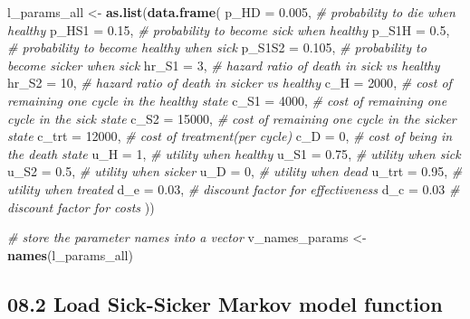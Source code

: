 \documentclass[
]{article}
\newenvironment{Shaded}{\begin{snugshade}}{\end{snugshade}}
\newcommand{\CommentTok}[1]{\textcolor[rgb]{0.56,0.35,0.01}{\textit{#1}}}
\newcommand{\DataTypeTok}[1]{\textcolor[rgb]{0.13,0.29,0.53}{#1}}
\newcommand{\DecValTok}[1]{\textcolor[rgb]{0.00,0.00,0.81}{#1}}
\newcommand{\FloatTok}[1]{\textcolor[rgb]{0.00,0.00,0.81}{#1}}
\newcommand{\KeywordTok}[1]{\textcolor[rgb]{0.13,0.29,0.53}{\textbf{#1}}}
\newcommand{\NormalTok}[1]{#1}
\newcommand{\StringTok}[1]{\textcolor[rgb]{0.31,0.60,0.02}{#1}}
\begin{document}
\begin{Shaded}
\begin{Highlighting}[]
\NormalTok{l_params_all <-}\StringTok{ }\KeywordTok{as.list}\NormalTok{(}\KeywordTok{data.frame}\NormalTok{(}
  \DataTypeTok{p_HD    =} \FloatTok{0.005}\NormalTok{,  }\CommentTok{# probability to die when healthy}
  \DataTypeTok{p_HS1   =} \FloatTok{0.15}\NormalTok{,   }\CommentTok{# probability to become sick when healthy}
  \DataTypeTok{p_S1H   =} \FloatTok{0.5}\NormalTok{,    }\CommentTok{# probability to become healthy when sick}
  \DataTypeTok{p_S1S2  =} \FloatTok{0.105}\NormalTok{,  }\CommentTok{# probability to become sicker when sick}
  \DataTypeTok{hr_S1   =} \DecValTok{3}\NormalTok{,      }\CommentTok{# hazard ratio of death in sick vs healthy}
  \DataTypeTok{hr_S2   =} \DecValTok{10}\NormalTok{,     }\CommentTok{# hazard ratio of death in sicker vs healthy}
  \DataTypeTok{c_H     =} \DecValTok{2000}\NormalTok{,   }\CommentTok{# cost of remaining one cycle in the healthy state}
  \DataTypeTok{c_S1    =} \DecValTok{4000}\NormalTok{,   }\CommentTok{# cost of remaining one cycle in the sick state}
  \DataTypeTok{c_S2    =} \DecValTok{15000}\NormalTok{,  }\CommentTok{# cost of remaining one cycle in the sicker state}
  \DataTypeTok{c_trt   =} \DecValTok{12000}\NormalTok{,  }\CommentTok{# cost of treatment(per cycle)}
  \DataTypeTok{c_D     =} \DecValTok{0}\NormalTok{,      }\CommentTok{# cost of being in the death state}
  \DataTypeTok{u_H     =} \DecValTok{1}\NormalTok{,      }\CommentTok{# utility when healthy}
  \DataTypeTok{u_S1    =} \FloatTok{0.75}\NormalTok{,   }\CommentTok{# utility when sick}
  \DataTypeTok{u_S2    =} \FloatTok{0.5}\NormalTok{,    }\CommentTok{# utility when sicker}
  \DataTypeTok{u_D     =} \DecValTok{0}\NormalTok{,      }\CommentTok{# utility when dead}
  \DataTypeTok{u_trt   =} \FloatTok{0.95}\NormalTok{,   }\CommentTok{# utility when treated}
  \DataTypeTok{d_e     =} \FloatTok{0.03}\NormalTok{,   }\CommentTok{# discount factor for effectiveness}
  \DataTypeTok{d_c     =} \FloatTok{0.03}    \CommentTok{# discount factor for costs}
\NormalTok{))}

\CommentTok{# store the parameter names into a vector}
\NormalTok{v_names_params <-}\StringTok{ }\KeywordTok{names}\NormalTok{(l_params_all)}
\end{Highlighting}
\end{Shaded}

\hypertarget{load-sick-sicker-markov-model-function}{%
\subsection{08.2 Load Sick-Sicker Markov model
function}\label{load-sick-sicker-markov-model-function}}
\end{document}

